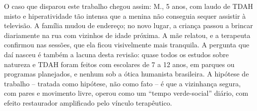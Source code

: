 O caso que disparou este trabalho chegou assim: M., 5 anos, com laudo de TDAH misto e hiperatividade t\~ao intensa que a menina n\~ao conseguia sequer assistir \`a televis\~ao. A fam\'ilia mudou de endere\c{c}o; no novo lugar, a crian\c{c}a passou a brincar diariamente na rua com vizinhos de idade pr\'oxima. A m\~ae relatou, e a terapeuta confirmou nas sess\~oes, que ela ficou visivelmente mais tranquila. A pergunta que da\'i nasceu \'e tamb\'em a lacuna desta revis\~ao: quase todos os estudos sobre natureza e TDAH foram feitos com escolares de 7 a 12 anos, em parques ou programas planejados, e nenhum sob a \'otica humanista brasileira. A hip\'otese de trabalho -- tratada como hip\'otese, n\~ao como fato -- \'e que a vizinhan\c{c}a segura, com pares e movimento livre, operou como um ``tempo verde-social'' di\'ario, com efeito restaurador amplificado pelo v\'inculo terap\^eutico.
